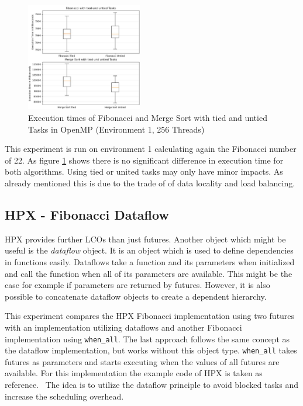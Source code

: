 \begin{figure}[h]
	\centering
	\includegraphics[width=0.45\textwidth]{figures/tied.JPG}
	\caption{Execution times of Fibonacci and Merge Sort with tied and untied Tasks in OpenMP (Environment 1, 256 Threads)}
	\label{fig:tied}
\end{figure}

  This experiment is run on environment 1 calculating again the Fibonacci number of 22.
  As figure \ref{fig:tied} shows there is no significant difference in execution time for both algorithms.
  Using tied or united tasks may only have minor impacts.
  As already mentioned this is due to the trade of of data locality and load balancing. 
  
\subsection{HPX - Fibonacci Dataflow}
HPX provides further LCOs than just futures.
Another object which might be useful is the \textit{dataflow} object.
It is an object which is used to define dependencies in functions easily.
Dataflows take a function and its parameters when initialized and call the function when all of its parameters are available. 
This might be the case for example if parameters are returned by futures.
However, it is also possible to concatenate dataflow objects to create a dependent hierarchy.~\cite{TheSTEARGroup.2020}

This experiment compares the HPX Fibonacci implementation using two futures with an implementation utilizing dataflows and another Fibonacci implementation using \texttt{when\_all}.
The last approach follows the same concept as the dataflow implementation, but works without this object type.
\texttt{when\_all} takes futures as parameters and starts executing when the values of all futures are available.
For this implementation the example code of HPX is taken as reference.~\cite{HPXGitHub.2020}
The idea is to utilize the dataflow principle to avoid blocked tasks and increase the scheduling overhead.

